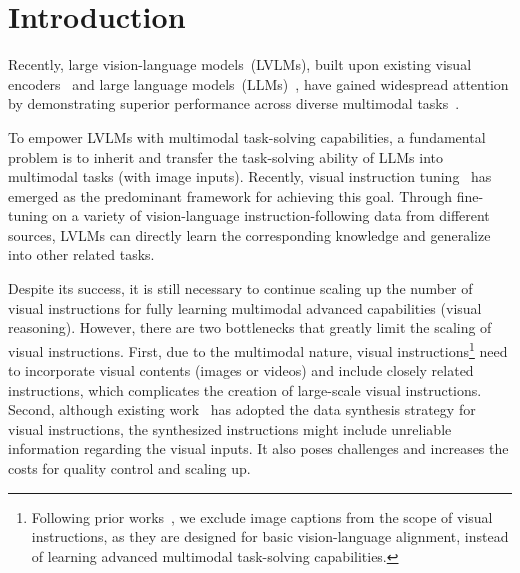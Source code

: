 \section{Introduction}
\label{sec:intro}


Recently, large vision-language models~(LVLMs), built upon existing visual encoders~\cite{dosovitskiy2020image,radford2021learning} and large language models~(LLMs)~\cite{brown2020language,zhao2023survey}, have gained widespread attention by demonstrating superior performance across diverse multimodal tasks~\cite{du2022survey,yin2023survey}. 

To empower LVLMs with multimodal task-solving capabilities, a fundamental problem is to inherit and transfer the task-solving ability of LLMs into multimodal tasks (with image inputs).
Recently, visual instruction tuning~\cite{liu2024visual,liu2024improved} has emerged as the predominant framework for achieving this goal.
Through fine-tuning on a variety of vision-language
instruction-following data from different sources, LVLMs can directly learn the corresponding knowledge and generalize into other related tasks.

Despite its success, it is still necessary to continue scaling up the number of visual instructions for fully learning multimodal advanced capabilities (\eg visual reasoning).
However, there are two bottlenecks that greatly limit the scaling of visual instructions.
First, due to the multimodal nature, visual instructions\footnote{Following prior works~\cite{liu2024visual}, we exclude image captions from the scope of visual instructions, as they are designed for basic vision-language alignment, instead of learning advanced multimodal task-solving capabilities.} need to incorporate visual contents (\eg images or videos) and include closely related instructions, which complicates the creation of large-scale visual instructions. Second, although existing work~\cite{liu2024visual,zhu2023minigpt} has adopted the data synthesis strategy for visual instructions, the synthesized instructions might include unreliable information regarding the visual inputs. It also poses challenges and increases the costs for quality control and scaling up. 

